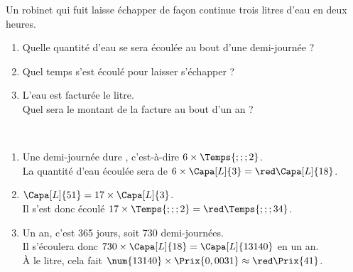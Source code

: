 \begin{exercice*} %
   Un robinet qui fuit laisse échapper de façon continue trois litres d’eau en deux heures.
   \begin{enumerate}
      \item Quelle quantité d’eau se sera écoulée au bout d’une demi-journée ?
      \item Quel temps s’est écoulé pour laisser s’échapper  ?
      \item L’eau est facturée  le litre. \\
         Quel sera le montant de la facture au bout d’un an ?
   \end{enumerate}
\end{exercice*}

\begin{corrige}
   \ \\ [-5mm]
   \begin{enumerate}
      \item Une demi-journée dure , c'est-à-dire $6\times\Temps{;;;2}$. \\
         La quantité d'eau écoulée sera de $6\times\Capa[L]{3} =\red \Capa[L]{18}$.
      \item $\Capa[L]{51} =17\times\Capa[L]{3}$. \\
         Il s'est donc écoulé $17\times\Temps{;;;2} =\red \Temps{;;;34}$.
      \item Un an, c'est 365 jours, soit 730 demi-journées. \\
         Il s'écoulera donc $730\times\Capa[L]{18} =\Capa[L]{13140}$ en un an. \\
         À  le litre, cela fait $\num{13140}\times\Prix{0,0031} \approx\red \Prix{41}$.
   \end{enumerate}
\end{corrige}
